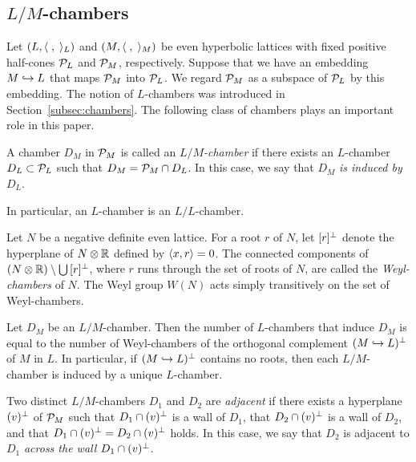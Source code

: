 \documentclass{amsart}
\numberwithin{procedure}{section}
\begin{document}
\subsection{$L/M$-chambers}\label{subsec:LMchams}
%
Let $(L, \langle \;,\; \rangle_L)$ and $(M, \langle \;,\; \rangle_M)$
be even hyperbolic lattices
with  fixed positive half-cones $\mathord{\mathcal P}_L$ and $\mathord{\mathcal P}_M$, respectively.
Suppose that we have an embedding $M\hookrightarrow L$
that maps $\mathord{\mathcal P}_M$ into $\mathord{\mathcal P}_L$.
We regard $\mathord{\mathcal P}_M$ as a subspace of $\mathord{\mathcal P}_L$ by this embedding.
The notion of $L$-chambers was introduced in Section~\ref{subsec:chambers}.  
The following class of chambers plays an important role in this paper.
%
\begin{definition}\label{def:wall}
A chamber $D_M$ in $\mathord{\mathcal P}_M$ is called
an \emph{$L/M$-chamber} 
if there exists 
an $L$-chamber $D_L \subset \mathord{\mathcal P}_L $
such that $D_M= \mathord{\mathcal P}_M\cap D_L $.
In this case,
we say that $D_M$ \emph{is induced by} $D_L$.
\end{definition}
%
In particular, an $L$-chamber is an $L/L$-chamber. 
%
\begin{definition}\label{def:Weyl-chambers}
Let $N$ be a negative definite even lattice.
For a root $r$ of $N$, let $[r]\sp{\perp}$ denote the hyperplane of $N\otimes \mathord{\mathbb R}$
defined by $\langle x, r \rangle=0$.
The connected components of $(N\otimes\mathord{\mathbb R})\setminus \bigcup\, [r]\sp{\perp}$,
where $r$ runs through the set of roots of $N$,
are called the \emph{Weyl-chambers} of  $N$.
The Weyl group $W(N)$ acts simply transitively on the set of 
Weyl-chambers.
\end{definition}
%
\begin{remark}
Let $D_M$ be an $L/M$-chamber.
Then the number of $L$-chambers that induce $D_M$ 
is equal to the number of Weyl-chambers of 
the orthogonal complement $(M\hookrightarrow L)\sp{\perp}$ of $M$ in $L$.
In particular, if $(M\hookrightarrow L)\sp{\perp}$ contains no roots,
then each $L/M$-chamber is 
induced by a unique $L$-chamber.
\end{remark}
%
\begin{definition}\label{def:adjacent}
Two distinct $L/M$-chambers $D_1$ and $D_2$ are \emph{adjacent}
if there exists a hyperplane $(v)\sp{\perp}$ of $\mathord{\mathcal P}_M$ such that
$D_1\cap (v)\sp{\perp}$ is a wall of $D_1$,
that $D_2\cap (v)\sp{\perp}$ is a wall of $D_2$,
and that $D_1\cap (v)\sp{\perp}=D_2\cap (v)\sp{\perp}$ holds.
In this case, we say that
$D_2$ is adjacent to $D_1$ \emph{across the wall $D_1\cap (v)\sp{\perp}$}.
\end{definition}
\end{document}
